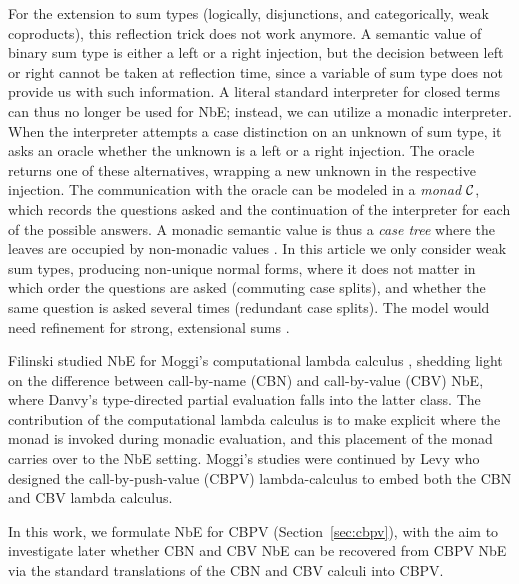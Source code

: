 \documentclass[sigplan,screen]{acmart}
\begin{document}
For the extension to sum types (logically, disjunctions, and categorically,
weak coproducts), this reflection trick does not work anymore.  A
semantic value of binary sum type is either a left or a right
injection, but the decision between left or right cannot be taken at
reflection time, since a variable of sum type does not provide us with
such information.  A literal standard interpreter for closed terms can
thus no longer be used for NbE;  instead, we can utilize a monadic
interpreter.  When the interpreter attempts a case distinction on an
unknown of sum type, it asks an oracle whether the unknown is a left
or a right injection.  The oracle returns one of these alternatives,
wrapping a new unknown in the respective injection.  The communication with the
oracle can be modeled in a \emph{monad} $\mathcal{C}$,
which records the questions asked and the continuation of the
interpreter for each of the possible answers.
A monadic semantic value is thus a \emph{case tree} where the leaves
are occupied by non-monadic values \cite{altenkirchUustalu:flops04}.
In this article we only consider weak sum types, producing non-unique
normal forms, where it does not
matter in which order the questions are asked (commuting case splits),
and whether the same
question is asked several times (redundant case splits).
The model would need refinement for strong, extensional sums
\cite{altenkirchDybjerHofmannScott:lics01,altenkirchUustalu:flops04,balatDiCosmoFiore:popl04,barral:PhD,scherer:popl17}.

Filinski \cite{filinski:tlca01} studied NbE for Moggi's computational lambda
calculus \cite{moggi:infcomp91}, shedding light on the difference
between call-by-name (CBN) and call-by-value (CBV) NbE, where Danvy's
type-directed partial evaluation \cite{danvy:popl96} falls into the
latter class.  The contribution of the computational lambda calculus
is to make explicit where the monad is invoked during monadic
evaluation, and this placement of the monad carries over to the NbE
setting.  Moggi's studies were continued by Levy \cite{levy:hosc06}
who designed the call-by-push-value (CBPV) lambda-calculus to embed
both the CBN and CBV lambda calculus.

In this work, we formulate NbE for CBPV
(Section~\ref{sec:cbpv}), with the aim to investigate
later whether CBN and CBV NbE can be recovered from CBPV NbE via the
standard translations of the CBN and CBV calculi into CBPV.
\end{document}
